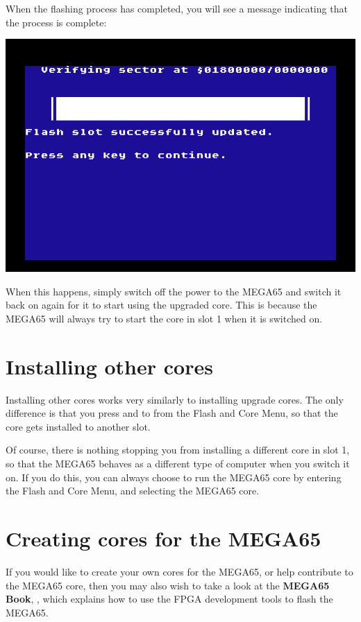 When the flashing process has completed, you will see a message indicating that the process is complete:

\begin{center}
\includegraphics[trim= 10mm  3mm 10mm 15mm,clip,width=0.7\linewidth]{images/ss-flashmenu-done.png}
\end{center}


When this happens, simply switch off the power to the MEGA65 and switch it back on again for it to start using the
upgraded core.  This is because the MEGA65 will always try to start the core in slot 1 when
it is switched on.

\section{Installing other cores}

Installing other cores works very similarly to installing upgrade cores. The only difference is that you
press  and  to  from the Flash and Core Menu, so that the core
gets installed to another slot.

Of course, there is nothing stopping you from installing a different core
in slot 1, so that the MEGA65 behaves as a different type of computer when you switch it on.  If you do this,
you can always choose to run the MEGA65 core by entering the Flash and Core Menu, and selecting the MEGA65
core.

\section{Creating cores for the MEGA65}

If you would like to create your own cores for the MEGA65, or help
contribute to the MEGA65 core, then
you may also wish to take a look at
\ifdefined\printmanual
the {\bf MEGA65 Book},
\else
{},
\fi
which explains how to use the
FPGA development tools to flash the MEGA65.

